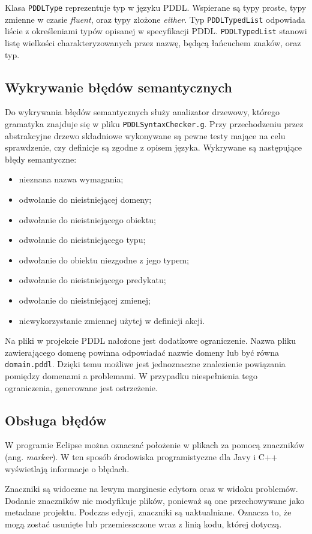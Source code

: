 Klasa \texttt{PDDLType} reprezentuje typ w języku PDDL. Wspierane są typy proste, typy 
zmienne w czasie \emph{fluent}, oraz typy złożone \emph{either}.
Typ \texttt{PDDLTypedList} odpowiada liście z określeniami typów opisanej w specyfikacji PDDL.
\texttt{PDDLTypedList} stanowi listę wielkości charakteryzowanych przez nazwę, będącą 
łańcuchem znaków, oraz typ.

\subsection{Wykrywanie błędów semantycznych}
Do wykrywania błędów semantycznych służy analizator drzewowy, którego gramatyka znajduje się
w pliku \texttt{PDDLSyntaxChecker.g}. Przy przechodzeniu przez abstrakcyjne drzewo składniowe
wykonywane są pewne testy mające na celu sprawdzenie, czy definicje są zgodne z opisem języka.
Wykrywane są następujące błędy semantyczne:
\begin{itemize}
\item nieznana nazwa wymagania;
\item odwołanie do nieistniejącej domeny;
\item odwołanie do nieistniejącego obiektu;
\item odwołanie do nieistniejącego typu;
\item odwołanie do obiektu niezgodne z jego typem;
\item odwołanie do nieistniejącego predykatu;
\item odwołanie do nieistniejącej zmienej;
\item niewykorzystanie zmiennej użytej w definicji akcji.
\end{itemize}

Na pliki w projekcie PDDL nałożone jest dodatkowe ograniczenie. Nazwa pliku zawierającego 
domenę powinna odpowiadać nazwie domeny lub być równa \texttt{domain.pddl}. Dzięki temu 
możliwe jest jednoznaczne znalezienie powiązania pomiędzy domenami a problemami. W przypadku
niespełnienia tego ograniczenia, generowane jest ostrzeżenie.

\subsection{Obsługa błędów}
W programie Eclipse można oznaczać położenie w plikach za pomocą znaczników (ang. \emph{marker}). W ten sposób
środowiska programistyczne dla Javy i C++ wyświetlają informacje o błędach.

Znaczniki są widoczne na lewym marginesie edytora oraz w widoku problemów. Dodanie znaczników
nie modyfikuje plików, ponieważ są one przechowywane jako metadane projektu. Podczas edycji,
znaczniki są uaktualniane. Oznacza to, że mogą zostać usunięte lub przemieszczone wraz z linią
kodu, której dotyczą.

